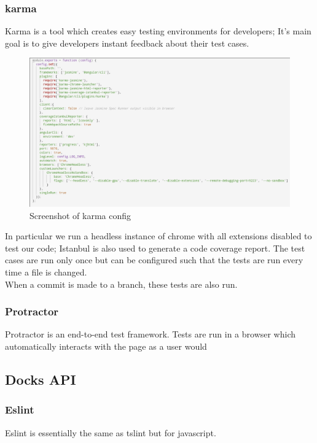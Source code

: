 \documentclass[]{article}
\begin{document}
\pagebreak

\subsubsection{karma}
Karma is a tool which creates easy testing environments for developers; It's main goal 
is to give developers instant feedback about their test cases.
\begin{figure}[H]
	\centering
	\includegraphics[scale=0.5]{karma.png}
	\caption{Screenshot of karma config}
\end{figure}

In particular we run a headless instance of chrome with all extensions
disabled to test our code; Istanbul is also used to generate a code coverage
report. The test cases are run only once but can be configured such that the tests
are run every time a file is changed.
\\
When a commit is made to a branch, these tests are also run.

\subsubsection{Protractor}
Protractor is an end-to-end test framework. Tests are run in a browser which automatically interacts
with the page as a user would

\subsection{Docks API}

\subsubsection{Eslint}
Eslint is essentially the same as tslint but for javascript.
\end{document}
